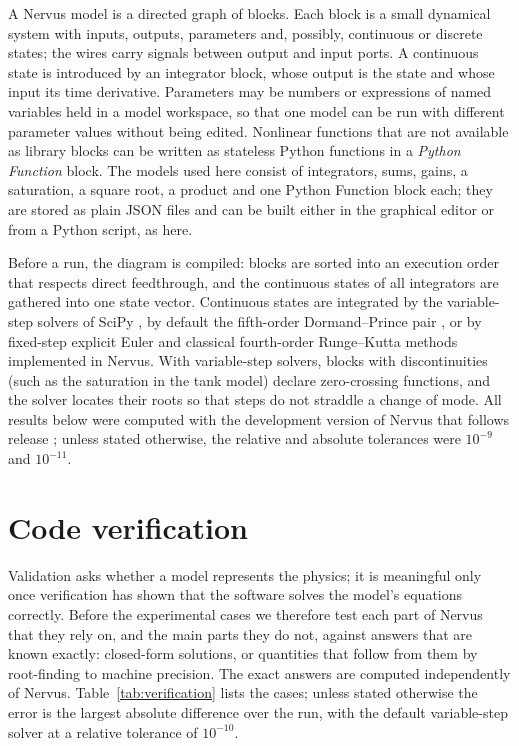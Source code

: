 \documentclass{jfm}
\begin{document}
A Nervus model is a directed graph of blocks. Each block is a small dynamical system with inputs, outputs,
parameters and, possibly, continuous or discrete states; the wires carry signals between output and input ports.
A continuous state is introduced by an integrator block, whose output is the state and whose input its time
derivative. Parameters may be numbers or expressions of named variables held in a model workspace, so that one
model can be run with different parameter values without being edited. Nonlinear functions that are not
available as library blocks can be written as stateless Python functions in a \emph{Python Function} block. The
models used here consist of integrators, sums, gains, a saturation, a square root, a product and one Python
Function block each; they are stored as plain JSON files and can be built either in the graphical editor or from a
Python script, as here.

Before a run, the diagram is compiled: blocks are sorted into an execution order that respects direct
feedthrough, and the continuous states of all integrators are gathered into one state vector. Continuous states
are integrated by the variable-step solvers of SciPy \citep{Virtanen2020}, by default the fifth-order
Dormand--Prince pair \citep{Dormand1980}, or by fixed-step explicit Euler and classical fourth-order Runge--Kutta
methods implemented in Nervus. With variable-step solvers, blocks with discontinuities (such as the saturation in
the tank model) declare zero-crossing functions, and the solver locates their roots so that steps do not straddle a
change of mode. All results below were computed with the development version of Nervus that follows release
\NervusVersion; unless stated otherwise, the relative and absolute tolerances were $10^{-9}$ and $10^{-11}$.

\section{Code verification}\label{sec:verification}

Validation asks whether a model represents the physics; it is meaningful only once verification has shown that the
software solves the model's equations correctly. Before the experimental cases we therefore test each part of
Nervus that they rely on, and the main parts they do not, against answers that are known exactly: closed-form
solutions, or quantities that follow from them by root-finding to machine precision. The exact answers are
computed independently of Nervus. Table~\ref{tab:verification} lists the cases; unless stated otherwise the error
is the largest absolute difference over the run, with the default variable-step solver at a relative tolerance of
$10^{-10}$.
\end{document}
